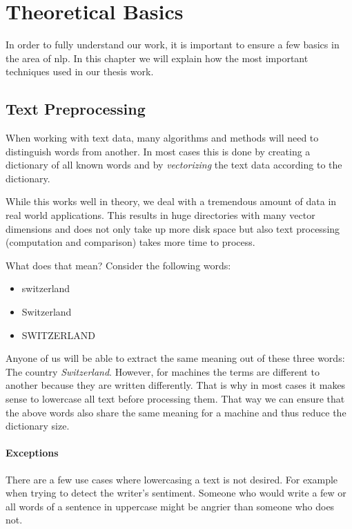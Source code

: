 \section{Theoretical Basics}
\label{sec:Theoretical_basics}

In order to fully understand our work,
it is important to ensure a few basics in the area of \Gls{nlp}.
In this chapter we will explain how the most important techniques used in our thesis work.

\subsection{Text Preprocessing}
\label{sec:text_preprocessing}

When working with text data, many algorithms and methods will need to distinguish words from another.
In most cases this is done by creating a dictionary of all known words and by \textit{vectorizing} the text data
according to the dictionary.

While this works well in theory, we deal with a tremendous amount of data in real world applications.
This results in huge directories with many vector dimensions and does not only take up more disk space
but also text processing (computation and comparison) takes more time to process.

What does that mean?
Consider the following words:

\begin{itemize}
    \item switzerland
    \item Switzerland
    \item SWITZERLAND
\end{itemize}

Anyone of us will be able to extract the same meaning out of these three words: The country \textit{Switzerland}.
However, for machines the terms are different to another because they are written differently.
That is why in most cases it makes sense to lowercase all text before processing them.
That way we can ensure that the above words also share the same meaning for a machine and thus reduce the dictionary size.

\paragraph{Exceptions}
There are a few use cases where lowercasing a text is not desired.
For example when trying to detect the writer's sentiment.
Someone who would write a few or all words of a sentence in uppercase might be angrier than someone who does not.

